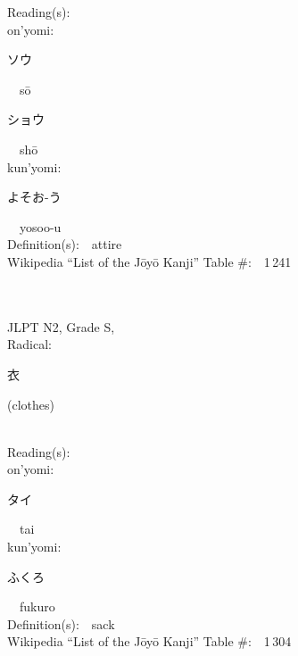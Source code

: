 \begin{multicols}{2}
Reading(s):\ \ \\
{\hspace*{1em}}on'yomi:\ \ \\
{\hspace*{2em}}{\begin{CJK}{UTF8}{min} ソウ \end{CJK}}\ \ s\=o\ \ \\
{\hspace*{2em}}{\begin{CJK}{UTF8}{min} ショウ \end{CJK}}\ \ sh\=o\ \ \\
{\hspace*{1em}}kun'yomi:\ \ \\
{\hspace*{2em}}{\begin{CJK}{UTF8}{min} よそお-う \end{CJK}}\ \ yosoo-u\ \ \\
Definition(s):\ \ attire \\
Wikipedia ``List of the J\=oy\=o Kanji'' Table \#:\ \ 1\,241 \\
\ \ \\
{\fontsize{34pt}{40pt}  }\ \ \\  %
{JLPT N2, Grade S, \\Radical:\ \ {\begin{CJK}{UTF8}{min} 衣 \end{CJK}} (clothes) } \\
Reading(s):\ \ \\
{\hspace*{1em}}on'yomi:\ \ \\
{\hspace*{2em}}{\begin{CJK}{UTF8}{min} タイ \end{CJK}}\ \ tai\ \ \\
{\hspace*{1em}}kun'yomi:\ \ \\
{\hspace*{2em}}{\begin{CJK}{UTF8}{min} ふくろ \end{CJK}}\ \ fukuro\ \ \\
Definition(s):\ \ sack \\
Wikipedia ``List of the J\=oy\=o Kanji'' Table \#:\ \ 1\,304 \\

\end{multicols}
